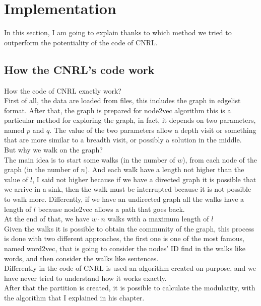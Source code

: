 \documentclass[epsfig,a4paper,11pt,titlepage,twoside,openany]{book}
\begin{document}

\newcommand{\mmax}[0]{mod\_withMax}
\newcommand{\mover}[0]{mod\_overlap }
\newcommand{\mmod}[0]{modified modularity}
\fi					%
%
\chapter{Implementation}
In this section, I am going to explain thanks to which method we tried to outperform the potentiality of the code of CNRL. 
\section{How the CNRL's code work}
How the code of CNRL exactly work?\\
First of all, the data are loaded from files, this includes the graph in edgelist format. After that, the graph is prepared for node2vec algorithm this is a particular method for exploring the graph, in fact, it depends on two parameters, named $p$ and $q$. The value of the two parameters allow a depth visit or something that are more similar to a breadth visit, or possibly a solution in the middle.\\
But why we walk on the graph?\\
The main idea is to start some walks (in the number of $w$), from each node of the graph (in the number of $n$). And each walk have a length not higher than the value of $l$, I said not higher because if we have a directed graph it is possible that we arrive in a sink, then the walk must be interrupted because it is not possible to walk more. Differently, if we have an undirected graph all the walks have a length of $l$ because node2vec allows a path that goes back.\\
At the end of that, we have $w \cdot n$ walks with a maximum length of $l$\\
Given the walks it is possible to obtain the community of the graph, this process is done with two different approaches, the first one is one of the most famous, named word2vec, that is going to consider the nodes' ID find in the walks like words, and then consider the walks like sentences.\\
Differently in the code of CNRL is used an algorithm created on purpose, and we have never tried to understand how it works exactly.\\
After that the partition is created, it is possible to calculate the modularity, with the algorithm that I explained in his chapter.
%
\end{document}
